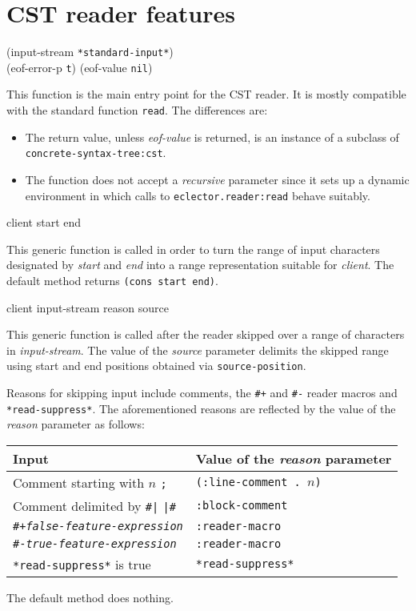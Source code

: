 \section{CST reader features}
\label{sec:cst-reader-features}

 {\optional (input-stream \texttt{*standard-input*})\\
  (eof-error-p \texttt{t})
  (eof-value \texttt{nil})}

This function is the main entry point for the CST reader.  It is
mostly compatible with the standard \commonlisp{} function
\texttt{read}.  The differences are:

\begin{itemize}
\item The return value, unless \textit{eof-value} is returned, is an
  instance of a subclass of \texttt{concrete-syntax-tree:cst}.
\item The function does not accept a \textit{recursive} parameter
  since it sets up a dynamic environment in which calls to
  \texttt{eclector.reader:read} behave suitably.
\end{itemize}

 {client start end}

This generic function is called in order to turn the range of input
characters designated by \textit{start} and \textit{end} into a range
representation suitable for \textit{client}.  The default method
returns \texttt{(cons start end)}.

 {client input-stream reason source}

This generic function is called after the reader skipped over a range
of characters in \textit{input-stream}.  The value of the
\textit{source} parameter delimits the skipped range using start and
end positions obtained via \texttt{source-position}.

Reasons for skipping input include comments, the \texttt{\#+} and
\texttt{\#-} reader macros and \texttt{*read-suppress*}.  The
aforementioned reasons are reflected by the value of the
\textit{reason} parameter as follows:

\begin{tabular}{ll}
  Input                                          & Value of the \textit{reason} parameter\\
  \hline
  Comment starting with $n$ \texttt{;}           & \texttt{(:line-comment . $n$)}\\
  Comment delimited by \texttt{\#|} \texttt{|\#} & \texttt{:block-comment}\\
  \texttt{\#+\textit{false-feature-expression}}  & \texttt{:reader-macro}\\
  \texttt{\#-\textit{true-feature-expression}}   & \texttt{:reader-macro}\\
  \texttt{*read-suppress*} is true               & \texttt{*read-suppress*}
\end{tabular}

The default method does nothing.